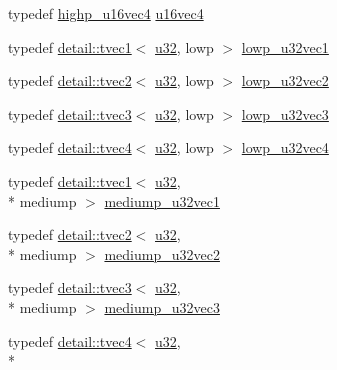 \begin{DoxyCompactItemize}
\item 
typedef \hyperlink{group__gtc__type__precision_ga89074b108ec0643cffdfd008bedd3ffb}{highp\-\_\-u16vec4} \hyperlink{group__gtc__type__precision_gaac02cce8820bcdbbeea9659aeaa718fb}{u16vec4}
\item 
typedef \hyperlink{structglm_1_1detail_1_1tvec1}{detail\-::tvec1}$<$ \hyperlink{group__gtc__type__precision_ga54e837745059fd29017bed71cfa0a8db}{u32}, lowp $>$ \hyperlink{group__gtc__type__precision_ga579d71c2ae1225b689aaab0bc7d33146}{lowp\-\_\-u32vec1}
\item 
typedef \hyperlink{structglm_1_1detail_1_1tvec2}{detail\-::tvec2}$<$ \hyperlink{group__gtc__type__precision_ga54e837745059fd29017bed71cfa0a8db}{u32}, lowp $>$ \hyperlink{group__gtc__type__precision_ga2f588e15c609987b89bd03f50b2a492d}{lowp\-\_\-u32vec2}
\item 
typedef \hyperlink{structglm_1_1detail_1_1tvec3}{detail\-::tvec3}$<$ \hyperlink{group__gtc__type__precision_ga54e837745059fd29017bed71cfa0a8db}{u32}, lowp $>$ \hyperlink{group__gtc__type__precision_ga53b6133cd2491fce1445c1744556b1bb}{lowp\-\_\-u32vec3}
\item 
typedef \hyperlink{structglm_1_1detail_1_1tvec4}{detail\-::tvec4}$<$ \hyperlink{group__gtc__type__precision_ga54e837745059fd29017bed71cfa0a8db}{u32}, lowp $>$ \hyperlink{group__gtc__type__precision_gaad6408408c9c5321cb6ee54f201de578}{lowp\-\_\-u32vec4}
\item 
typedef \hyperlink{structglm_1_1detail_1_1tvec1}{detail\-::tvec1}$<$ \hyperlink{group__gtc__type__precision_ga54e837745059fd29017bed71cfa0a8db}{u32}, \\*
mediump $>$ \hyperlink{group__gtc__type__precision_ga323fb0ed8f492d918b087226db2994f3}{mediump\-\_\-u32vec1}
\item 
typedef \hyperlink{structglm_1_1detail_1_1tvec2}{detail\-::tvec2}$<$ \hyperlink{group__gtc__type__precision_ga54e837745059fd29017bed71cfa0a8db}{u32}, \\*
mediump $>$ \hyperlink{group__gtc__type__precision_ga5d16ea7e110d8ba923ca347c16704f88}{mediump\-\_\-u32vec2}
\item 
typedef \hyperlink{structglm_1_1detail_1_1tvec3}{detail\-::tvec3}$<$ \hyperlink{group__gtc__type__precision_ga54e837745059fd29017bed71cfa0a8db}{u32}, \\*
mediump $>$ \hyperlink{group__gtc__type__precision_ga84a903ce8834b22f78d80a64eb0181bb}{mediump\-\_\-u32vec3}
\item 
typedef \hyperlink{structglm_1_1detail_1_1tvec4}{detail\-::tvec4}$<$ \hyperlink{group__gtc__type__precision_ga54e837745059fd29017bed71cfa0a8db}{u32}, \\*

\end{DoxyCompactItemize}
